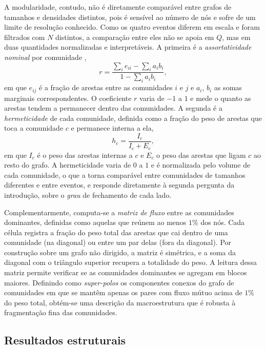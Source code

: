 \documentclass[conference]{IEEEtran}
\begin{document}
A modularidade, contudo, não é diretamente comparável entre grafos de tamanhos e densidades distintos, pois é sensível ao número de nós e sofre de um limite de resolução conhecido. Como os quatro eventos diferem em escala e foram filtrados com $N$ distintos, a comparação entre eles não se apoia em $Q$, mas em duas quantidades normalizadas e interpretáveis. A primeira é a \emph{assortatividade nominal} por comunidade \cite{b_newman2003},
\begin{equation}
r = \frac{\sum_i e_{ii} - \sum_i a_i b_i}{1 - \sum_i a_i b_i},
\label{eq:assort}
\end{equation}
em que $e_{ij}$ é a fração de arestas entre as comunidades $i$ e $j$ e $a_i$, $b_i$ as somas marginais correspondentes. O coeficiente $r$ varia de $-1$ a $1$ e mede o quanto as arestas tendem a permanecer dentro das comunidades. A segunda é a \emph{hermeticidade} de cada comunidade, definida como a fração do peso de arestas que toca a comunidade $c$ e permanece interna a ela,
\begin{equation}
h_c = \frac{I_c}{I_c + E_c},
\label{eq:herm}
\end{equation}
em que $I_c$ é o peso das arestas internas a $c$ e $E_c$ o peso das arestas que ligam $c$ ao resto do grafo. A hermeticidade varia de $0$ a $1$ e é normalizada pelo volume de cada comunidade, o que a torna comparável entre comunidades de tamanhos diferentes e entre eventos, e responde diretamente à segunda pergunta da introdução, sobre o \emph{grau} de fechamento de cada lado.

Complementarmente, computa-se a \emph{matriz de fluxo} entre as comunidades dominantes, definidas como aquelas que reúnem ao menos $1\%$ dos nós. Cada célula registra a fração do peso total das arestas que cai dentro de uma comunidade (na diagonal) ou entre um par delas (fora da diagonal). Por construção sobre um grafo não dirigido, a matriz é simétrica, e a soma da diagonal com o triângulo superior recupera a totalidade do peso. A leitura dessa matriz permite verificar se as comunidades dominantes se agregam em blocos maiores. Definindo como \emph{super-polos} os componentes conexos do grafo de comunidades em que se mantêm apenas os pares com fluxo mútuo acima de $1\%$ do peso total, obtém-se uma descrição da macroestrutura que é robusta à fragmentação fina das comunidades.

\subsection{Resultados estruturais}
\label{sub:resultados}
\end{document}
